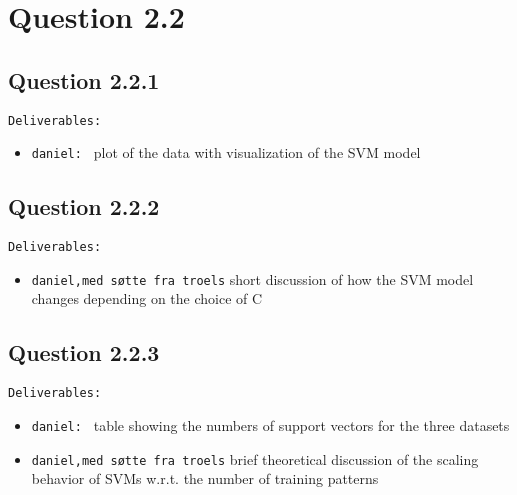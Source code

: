 \section*{Question 2.2}

\subsection*{Question 2.2.1}

\texttt{Deliverables:} 
\begin{itemize}
	\item \texttt{daniel: } plot of the data with visualization of the SVM model 
\end{itemize}

\subsection*{Question 2.2.2}

\texttt{Deliverables:} 
\begin{itemize}
	\item \texttt{daniel,med søtte fra troels} short discussion of how the SVM model changes depending on the choice of C 
\end{itemize}

\subsection*{Question 2.2.3}

\texttt{Deliverables:} 
\begin{itemize}
	
	\item \texttt{daniel: } table showing the numbers of support vectors for the three datasets
	
	\item \texttt{daniel,med søtte fra troels} brief theoretical discussion of the scaling behavior of SVMs w.r.t. the number of training patterns 
\end{itemize}
